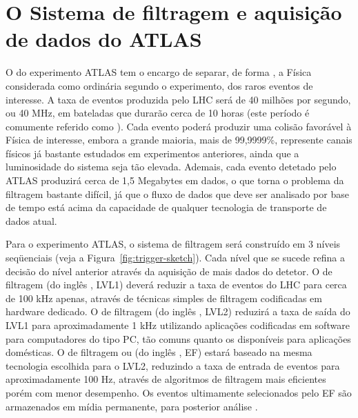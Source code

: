 \typeout{ ====================================================================}
\typeout{ ====================================================================}

\chapter{O Sistema de filtragem e aquisição de dados do ATLAS}
\label{chap:trigger}

O  do experimento ATLAS tem o encargo de separar, de
forma , a Física considerada como ordinária segundo o experimento,
dos raros eventos de interesse. A taxa de eventos produzida pelo LHC será de
40 milhões por segundo, ou 40 MHz, em bateladas que durarão cerca de 10 horas
(este período é comumente referido como ). Cada evento poderá
produzir uma colisão favorável à Física de interesse, embora a grande maioria,
mais de 99,9999\%, represente canais físicos já bastante estudados em
experimentos anteriores, ainda que a luminosidade do sistema seja tão
elevada. Ademais, cada evento detetado pelo ATLAS produzirá cerca de 1,5
Megabytes em dados, o que torna o problema da filtragem bastante difícil, já
que o fluxo de dados que deve ser analisado por base de tempo está acima da
capacidade de qualquer tecnologia de transporte de dados atual.

Para o experimento ATLAS, o sistema de filtragem será construído em 3 níveis
seqüenciais (veja a Figura~\ref{fig:trigger-sketch}). Cada nível que se sucede
refina a decisão do nível anterior através da aquisição de mais dados do
detetor. O  de filtragem (do inglês , LVL1) deverá reduzir a taxa de eventos do LHC para cerca de 100 kHz
apenas, através de técnicas simples de filtragem codificadas em hardware
dedicado. O  de filtragem (do inglês
, LVL2) reduzirá a taxa de saída do LVL1 para
aproximadamente 1 kHz utilizando aplicações codificadas em software para
computadores do tipo PC, tão comuns quanto os disponíveis para aplicações
domésticas. O  de filtragem ou
 (do inglês , EF) estará baseado
na mesma tecnologia escolhida para o LVL2, reduzindo a taxa de entrada de
eventos para aproximadamente 100 Hz, através de algoritmos de filtragem mais
eficientes porém com menor desempenho. Os eventos ultimamente selecionados
pelo EF são armazenados em mídia permanente, para posterior análise
. 

